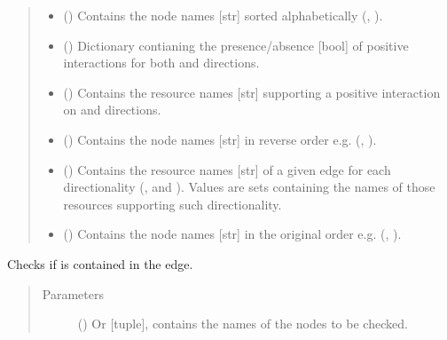 \documentclass[letterpaper,10pt,english]{sphinxmanual}
\begin{document}
\begin{fulllineitems}
\begin{quote}
\begin{description}
\begin{itemize}
\item {} 
 () \textendash{} Contains the node names {[}str{]} sorted alphabetically (,
).

\item {} 
 () \textendash{} Dictionary contianing the presence/absence {[}bool{]} of positive
interactions for both  and 
directions.

\item {} 
 () \textendash{} Contains the resource names {[}str{]} supporting a positive
interaction on  and 
directions.

\item {} 
 () \textendash{} Contains the node names {[}str{]} in reverse order e.g. (,
).

\item {} 
 () \textendash{} Contains the resource names {[}str{]} of a given edge for each
directionality (,  and
). Values are sets containing the names of those
resources supporting such directionality.

\item {} 
 () \textendash{} Contains the node names {[}str{]} in the original order e.g.
(, ).

\end{itemize}

\end{description}\end{quote}

\begin{fulllineitems}
\label{\detokenize{main:pypath.main.Direction.check_nodes}}
Checks if  is contained in the edge.
\begin{quote}\begin{description}
\item[{Parameters}] \leavevmode
{} () \textendash{} Or {[}tuple{]}, contains the names of the nodes to be checked.


\end{description}
\end{quote}
\end{fulllineitems}
\end{fulllineitems}
\end{document}
